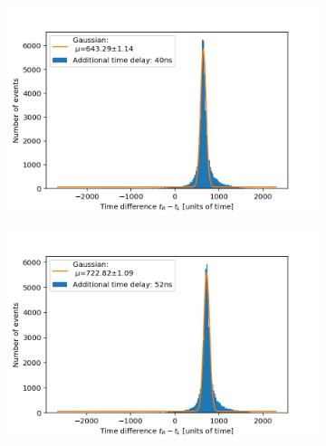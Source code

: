 \documentclass[]{article}
\begin{document}
\begin{figure}[H]
\centering
\medskip
\begin{subfigure}{0.48\textwidth}
\includegraphics[width=\linewidth]{Plots/Time/40ns.png}
\end{subfigure}
\begin{subfigure}[c]{0.48\linewidth}
\includegraphics[width=\linewidth]{Plots/Time/52ns.png}
\end{subfigure}


\end{figure}
\end{document}
